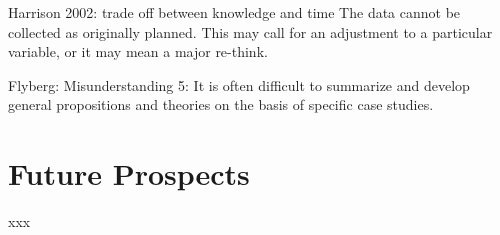 \documentclass[11pt]{report}
\begin{document}
Harrison 2002:
trade off between knowledge and time
The data cannot be collected as originally planned. This may call for an
adjustment to a particular variable, or it may mean a major re-think.

Flyberg:
Misunderstanding 5: It is often difficult to summarize and develop general propositions and theories on the basis of specific case studies.

\section{Future Prospects}

xxx



\begin{small}

\end{small}



\newpage
\appendix
\noappendicestocpagenum
\addappheadtotoc
\end{document}
